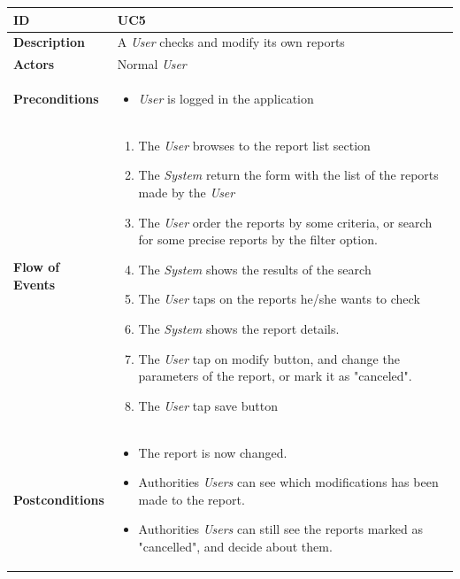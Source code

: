 





\begin{table}[H]
\begin{tabular}{|l|p{}|}
\hline
\textbf{ID}             & UC5                                                                             \\ \hline
\textbf{Description}    & A \textit{User} checks and modify its own reports \\ \hline
\textbf{Actors}         & Normal  \textit{User}                                                                     \\ \hline

\textbf{Preconditions}  &   \begin{itemize}

 \item \textit{User} is logged in the application
                 \end{itemize}     
                    \\ \hline
                    
\textbf{Flow of Events} &   \begin{enumerate}
    \item The \textit{User} browses to the report list section
    \item The \textit{System} return the form with the list of the reports made by the \textit{User}
    \item The \textit{User} order the reports by some criteria, or search for some precise reports by the filter option. 
     \item The \textit{System} shows the results of the search
    \item The \textit{User} taps on the reports he/she wants to check
    \item The \textit{System} shows the report details.
    \item  The \textit{User} tap on modify button, and change the parameters of the report, or mark it as "canceled".
    \item The \textit{User} tap save button
   
\end{enumerate}                                                                             \\ \hline
\textbf{Postconditions} & \begin{itemize}
     
 \item The report is now changed.
 \item Authorities \textit{Users} can see which modifications has been made to the report.
 \item Authorities \textit{Users} can still see the reports marked as  "cancelled", and decide about them.
 \end{itemize}\\ \hline


\end{tabular}
\end{table}
